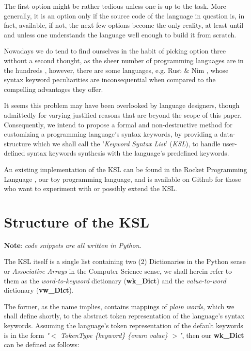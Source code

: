 \documentclass{article}
\begin{document}
\begin{multicols}{2}
The first option might be rather tedious unless one is up to the task. More generally, it is an option only if the source code of the language in question is, in fact, available, if not, the next few options become the only reality, at least until and unless one understands the language well enough to build it from scratch.

Nowadays we do tend to find ourselves in the habit of picking option three without a second thought, as the sheer number of programming languages are in the hundreds \cite{Langlst}, however, there are some languages, e.g. Rust \cite{Rust} \& Nim \cite{Nim}, whose syntax keyword peculiarities are inconsequential when compared to the compelling advantages they offer.

It seems this problem may have been overlooked by language designers, though admittedly for varying justified reasons that are beyond the scope of this paper. Consequently, we intend to propose a formal and non-destructive method for customizing a programming language's syntax keywords, by providing a data-structure which we shall call the '\textit{Keyword Syntax List}' (\textit{KSL}), to handle user-defined syntax keywords synthesis with the language's predefined keywords.

An existing implementation of the KSL can be found in the Rocket Programming Language \cite{Rocket}, our toy programming language, and is available on Github \cite{Rocket} for those who want to experiment with or possibly extend the KSL.

\end{multicols}


\section{Structure of the KSL}

\textbf{Note}: \textit{code snippets are all written in Python}.
\newline

The KSL itself is a single list containing two (2) Dictionaries in the Python sense or \textit{Associative Arrays} in the Computer Science sense, we shall herein refer to them as the \textit{word-to-keyword} dictionary (\textbf{wk\_Dict}) and the \textit{value-to-word} dictionary (\textbf{vw\_Dict}). 

The former, as the name implies, contains mappings of \textit{plain words}, which we shall define shortly, to the abstract token representation of the language's syntax keywords. Assuming the language's token representation of the default keywords is in the form \textit{"$<$ TokenType \{keyword\} \{enum value\} $>$"}, then our \textbf{wk\_Dict} can be defined as follows:
\end{document}
